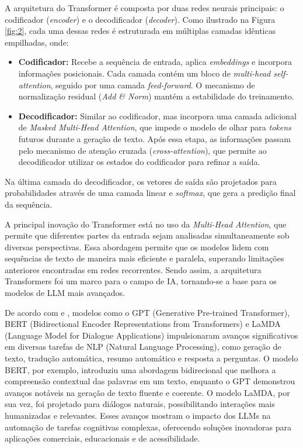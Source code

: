 A arquitetura do Transformer é composta por duas redes neurais principais: o codificador (\textit{encoder}) e o decodificador (\textit{decoder}). Como ilustrado na Figura \ref{fig:2}, cada uma dessas redes é estruturada em múltiplas camadas idênticas empilhadas, onde:

\begin{itemize}
    \item \textbf{Codificador:} Recebe a sequência de entrada, aplica \textit{embeddings} e incorpora informações posicionais. Cada camada contém um bloco de \textit{multi-head self-attention}, seguido por uma camada \textit{feed-forward}. O mecanismo de normalização residual (\textit{Add \& Norm}) mantém a estabilidade do treinamento.
    \item \textbf{Decodificador:} Similar ao codificador, mas incorpora uma camada adicional de \textit{Masked Multi-Head Attention}, que impede o modelo de olhar para \textit{tokens} futuros durante a geração de texto. Após essa etapa, as informações passam pelo mecanismo de atenção cruzada (\textit{cross-attention}), que permite ao decodificador utilizar os estados do codificador para refinar a saída.
\end{itemize}

Na última camada do decodificador, os vetores de saída são projetados para probabilidades através de uma camada linear e \textit{softmax}, que gera a predição final da sequência.

A principal inovação do Transformer está no uso da \textit{Multi-Head Attention}, que permite que diferentes partes da entrada sejam analisadas simultaneamente sob diversas perspectivas. Essa abordagem permite que os modelos lidem com sequências de texto de maneira mais eficiente e paralela, superando limitações anteriores encontradas em redes recorrentes. Sendo assim, a arquitetura Transformers foi um marco para o campo de IA, tornando-se a base para os modelos de LLM mais avançados.

De acordo com  e , modelos como o GPT (Generative Pre-trained Transformer), BERT (Bidirectional Encoder Representations from Transformers) e LaMDA (Language Model for Dialogue Applications) impulsionaram avanços significativos em diversas tarefas de NLP (Natural Language Processing), como geração de texto, tradução automática, resumo automático e resposta a perguntas. O modelo BERT, por exemplo, introduziu uma abordagem bidirecional que melhora a compreensão contextual das palavras em um texto, enquanto o GPT demonstrou avanços notáveis na geração de texto fluente e coerente. O modelo LaMDA, por sua vez, foi projetado para diálogos naturais, possibilitando interações mais humanizadas e relevantes. Esses avanços mostram o impacto dos LLMs na automação de tarefas cognitivas complexas, oferecendo soluções inovadoras para aplicações comerciais, educacionais e de acessibilidade.

